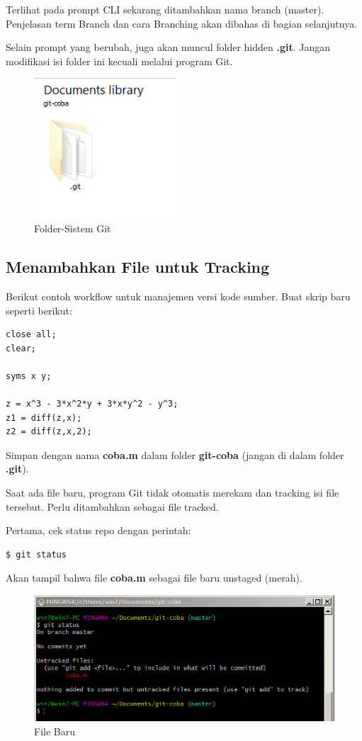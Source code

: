 \documentclass[12pt]{book}
\begin{document}
	Terlihat pada prompt CLI sekarang ditambahkan nama branch (master).
	Penjelasan term Branch dan cara Branching akan dibahas di bagian selanjutnya.

	\newpage
	Selain prompt yang berubah, juga akan muncul folder hidden \textbf{.git}.
	Jangan modifikasi isi folder ini kecuali melalui program Git.

	\begin{figure}[!ht]
		\centering
		\includegraphics[width=150pt]{images/git2}
		\caption{Folder-Sistem Git}
	\end{figure}

	\subsection{Menambahkan File untuk Tracking}

	Berikut contoh workflow untuk manajemen versi kode sumber.
	Buat skrip baru seperti berikut:
	\begin{verbatim}
close all;
clear;

syms x y;

z = x^3 - 3*x^2*y + 3*x*y^2 - y^3;
z1 = diff(z,x);
z2 = diff(z,x,2);
	\end{verbatim}

	Simpan dengan nama \textbf{coba.m} dalam folder \textbf{git-coba} (jangan di dalam folder \textbf{.git}).

	Saat ada file baru, program Git tidak otomatis merekam dan tracking isi file tersebut.
	Perlu ditambahkan sebagai file tracked.

	Pertama, cek status repo dengan perintah:
	\begin{verbatim}
$ git status
	\end{verbatim}

	Akan tampil bahwa file \textbf{coba.m} sebagai file baru unstaged (merah).

	\begin{figure}[!ht]
		\centering
		\includegraphics[width=400pt]{images/git3}
		\caption{File Baru}
	\end{figure}
\end{document}
